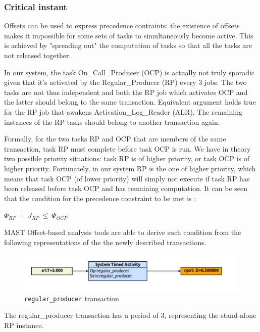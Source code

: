 \documentclass{article}
\begin{document}
\subsubsection{Critical instant}

Offsets can be used to express precedence contraints: the existence of offsets makes it impossible for some sets of tasks to simultaneously become active. This is achieved by "spreading out" the computation of tasks so that all the tasks are not released together.

In our system, the task On\_Call\_Producer (OCP) is actually not truly sporadic given that it's activated by the Regular\_Producer (RP) every 3 jobs. The two tasks are not thus independent and both the RP job which activates OCP and the latter should belong to the same transaction. Equivalent argument holds true for the RP job that awakens Activation\_Log\_Reader (ALR). The remaining instances of the RP tasks should belong to another transaction again.

Formally, for the two tasks RP and OCP that are members of the same transaction, task RP must complete before task OCP is run. We have in theory two possible priority situations: task RP is of higher priority, or task OCP is of higher priority. Fortunately, in our system RP is the one of higher priority, which means that task OCP (of lower priority) will simply not execute if task RP has been released before task OCP and has remaining computation. It can be seen that the condition for the precedence constraint to be met is \cite{tindell-offsets}:

$\Phi_{RP}\ +\ J_{RP}\ \le\ \Phi_{OCP}$

MAST Offset-based analysis tools are able to derive such condition from the following representations of the the newly described transactions.

\begin{figure}[!htbp]
\centering
\includegraphics[width=5in]{images/transaction-rp-offset}
\caption{\texttt{regular\_producer} transaction}
\label{transaction-rp-offset}
\end{figure}

The {regular\_producer} transaction has a period of 3, representing the stand-alone RP instance.
\end{document}
